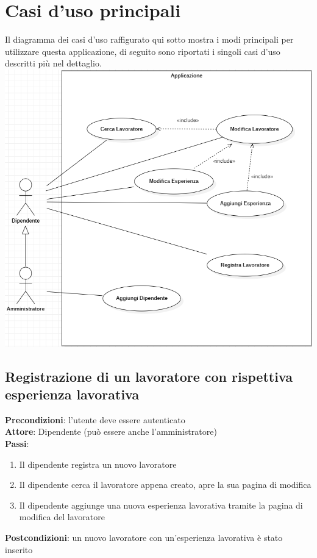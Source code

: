 \documentclass[ 4paper,11pt,openany]{book}
\begin{document}
\section{Casi d'uso principali}
Il diagramma dei casi d'uso raffigurato qui sotto mostra i modi principali per utilizzare questa applicazione, di seguito sono riportati i singoli casi d'uso descritti più nel dettaglio.\\
\advance\leftskip-0.5cm
\includegraphics[width=180mm]{casi.png}

\subsection{Registrazione di un lavoratore con rispettiva esperienza lavorativa}
\textbf{Precondizioni}: l'utente deve essere autenticato\\
\textbf{Attore}: Dipendente (può essere anche l'amministratore)\\
\textbf{Passi}:
\begin{enumerate}
\item Il dipendente registra un nuovo lavoratore
\item Il dipendente cerca il lavoratore appena creato, apre la sua pagina di modifica 
\item Il dipendente aggiunge una nuova esperienza lavorativa tramite la pagina di modifica del lavoratore
\end{enumerate}
\textbf{Postcondizioni}: un nuovo lavoratore con un'esperienza lavorativa è stato inserito\\
\end{document}
